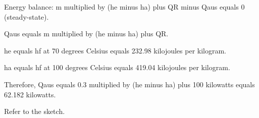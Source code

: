 Energy balance:  
m multiplied by (he minus ha) plus QR minus Qaus equals 0 (steady-state).  

Qaus equals m multiplied by (he minus ha) plus QR.  

he equals hf at 70 degrees Celsius equals 232.98 kilojoules per kilogram.  

ha equals hf at 100 degrees Celsius equals 419.04 kilojoules per kilogram.  

Therefore, Qaus equals 0.3 multiplied by (he minus ha) plus 100 kilowatts equals 62.182 kilowatts.  

Refer to the sketch.